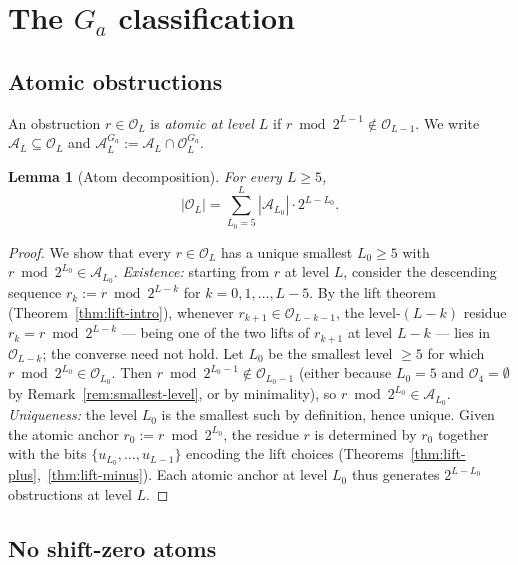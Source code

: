 \documentclass[11pt,reqno]{amsart}
\theoremstyle{plain}
\newtheorem{lemma}[theorem]{Lemma}
\theoremstyle{definition}
\theoremstyle{remark}
\newcommand{\Obs}{\mathcal{O}}
\newcommand{\Atom}{\mathcal{A}}
\begin{document}
\section{The \texorpdfstring{$G_a$}{Ga} classification}
\label{sec:Ga}

\subsection{Atomic obstructions}

An obstruction $r \in \Obs_L$ is \emph{atomic at level $L$} if
$r \bmod 2^{L-1} \notin \Obs_{L-1}$. We write $\Atom_L \subseteq \Obs_L$ and
$\Atom_L^{G_a} := \Atom_L \cap \Obs_L^{G_a}$.

\begin{lemma}[Atom decomposition]
\label{lem:atom-decomp}
For every $L \ge 5$,
\[
|\Obs_L| = \sum_{L_0 = 5}^{L} |\Atom_{L_0}| \cdot 2^{L - L_0}.
\]
\end{lemma}

\begin{proof}
We show that every $r \in \Obs_L$ has a unique smallest $L_0 \ge 5$ with
$r \bmod 2^{L_0} \in \Atom_{L_0}$. \emph{Existence:} starting from $r$ at
level $L$, consider the descending sequence $r_k := r \bmod 2^{L-k}$ for
$k = 0, 1, \ldots, L - 5$. By the lift theorem (Theorem~\ref{thm:lift-intro}),
whenever $r_{k+1} \in \Obs_{L-k-1}$, the level-$(L-k)$ residue
$r_k = r \bmod 2^{L-k}$ — being one of the two lifts of $r_{k+1}$ at
level $L - k$ — lies in $\Obs_{L-k}$; the converse need not hold. Let
$L_0$ be the smallest level $\ge 5$ for which
$r \bmod 2^{L_0} \in \Obs_{L_0}$. Then
$r \bmod 2^{L_0 - 1} \notin \Obs_{L_0 - 1}$ (either because $L_0 = 5$
and $\Obs_4 = \emptyset$ by Remark~\ref{rem:smallest-level}, or by
minimality), so $r \bmod 2^{L_0} \in \Atom_{L_0}$.
\emph{Uniqueness:} the level $L_0$ is the smallest such by definition, hence
unique. Given the atomic anchor $r_0 := r \bmod 2^{L_0}$, the residue $r$ is
determined by $r_0$ together with the bits $\{u_{L_0}, \ldots, u_{L-1}\}$
encoding the lift choices (Theorems~\ref{thm:lift-plus},~\ref{thm:lift-minus}).
Each atomic anchor at level $L_0$ thus generates $2^{L - L_0}$ obstructions
at level $L$. \qedhere
\end{proof}

\subsection{No shift-zero atoms}
\end{document}
